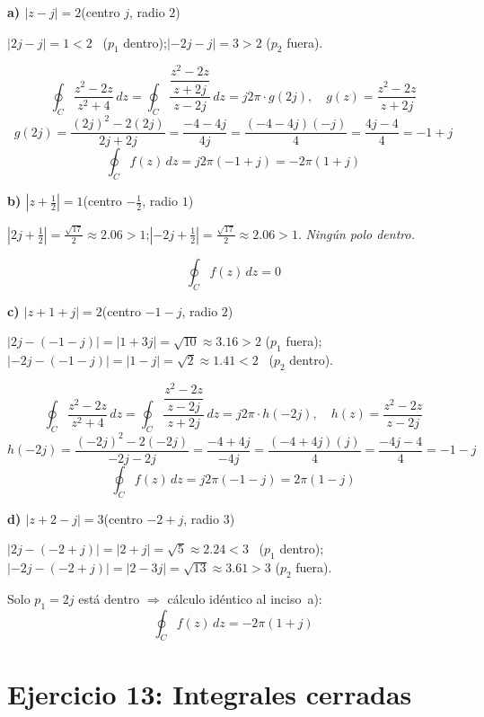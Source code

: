\documentclass[10pt,a4paper]{article}
\begin{document}
\bigskip

\noindent\textbf{a) $|z-j|=2$}\quad (centro $j$, radio $2$)

$|2j - j|=1<2$ \checkmark\ ($p_1$ dentro);\quad $|-2j-j|=3>2$ ($p_2$ fuera).

\[
	\oint_C \frac{z^2-2z}{z^2+4}\,dz
	= \oint_C \frac{\dfrac{z^2-2z}{z+2j}}{z-2j}\,dz
	= j2\pi\cdot g(2j), \quad g(z)=\frac{z^2-2z}{z+2j}
\]
\[
	g(2j) = \frac{(2j)^2-2(2j)}{2j+2j} = \frac{-4-4j}{4j}
	= \frac{(-4-4j)(-j)}{4} = \frac{4j-4}{4} = -1+j
\]
\[
	\boxed{\oint_C f(z)\,dz = j2\pi(-1+j) = -2\pi(1+j)}
\]

\bigskip

\noindent\textbf{b) $\left|z+\tfrac{1}{2}\right|=1$}\quad (centro $-\tfrac{1}{2}$, radio $1$)

$\left|2j+\tfrac{1}{2}\right|=\tfrac{\sqrt{17}}{2}\approx2.06>1$;\quad $\left|-2j+\tfrac{1}{2}\right|=\tfrac{\sqrt{17}}{2}\approx2.06>1$. \textit{Ningún polo dentro.}

\[
	\boxed{\oint_C f(z)\,dz = 0}
\]

\bigskip

\noindent\textbf{c) $|z+1+j|=2$}\quad (centro $-1-j$, radio $2$)

$|2j-(-1-j)|=|1+3j|=\sqrt{10}\approx3.16>2$ ($p_1$ fuera);\quad $|-2j-(-1-j)|=|1-j|=\sqrt{2}\approx1.41<2$ \checkmark\ ($p_2$ dentro).

\[
	\oint_C \frac{z^2-2z}{z^2+4}\,dz
	= \oint_C \frac{\dfrac{z^2-2z}{z-2j}}{z+2j}\,dz = j2\pi\cdot h(-2j),
	\quad h(z)=\frac{z^2-2z}{z-2j}
\]
\[
	h(-2j) = \frac{(-2j)^2-2(-2j)}{-2j-2j} = \frac{-4+4j}{-4j}
	= \frac{(-4+4j)(j)}{4} = \frac{-4j-4}{4} = -1-j
\]
\[
	\boxed{\oint_C f(z)\,dz = j2\pi(-1-j) = 2\pi(1-j)}
\]

\bigskip

\noindent\textbf{d) $|z+2-j|=3$}\quad (centro $-2+j$, radio $3$)

$|2j-(-2+j)|=|2+j|=\sqrt{5}\approx2.24<3$ \checkmark\ ($p_1$ dentro);\quad $|-2j-(-2+j)|=|2-3j|=\sqrt{13}\approx3.61>3$ ($p_2$ fuera).

Solo $p_1=2j$ está dentro $\Rightarrow$ cálculo idéntico al inciso~a):
\[
	\boxed{\oint_C f(z)\,dz = -2\pi(1+j)}
\]

\section*{Ejercicio 13: Integrales cerradas}
\end{document}
